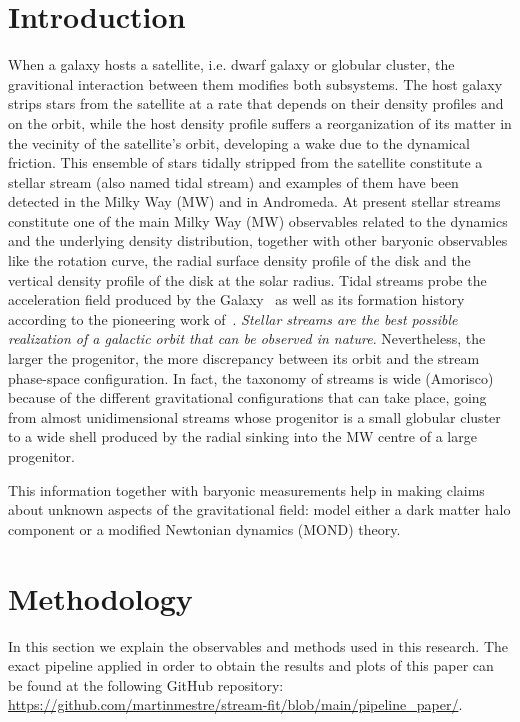 \documentclass[twocolumn]{aa}
\begin{document}
   \maketitle

\section{Introduction}
When a galaxy hosts a satellite, i.e. dwarf galaxy or globular cluster, the gravitional interaction
between them modifies both subsystems. The host galaxy strips stars from the satellite at a rate
that depends on their density profiles and on the orbit,
while the host density profile suffers a reorganization of its matter in the vecinity of the satellite's orbit, developing a wake due to the dynamical friction.
This ensemble of stars tidally stripped from the satellite constitute a stellar stream (also named tidal stream) and examples of them have been detected in the Milky Way (MW) and in Andromeda.
At present stellar streams constitute one of the main Milky Way (MW) observables related to the dynamics and the underlying density distribution, together with other baryonic observables like the rotation curve, the radial surface density profile of the disk and the vertical density profile of the disk at the solar radius.
Tidal streams probe the acceleration field produced by the Galaxy~\citep{1999ApJ...512L.109J,2016ASSL..420..169J,Ibata_2016,2017ApJ...842..120I,2017A&A...603A..65T} as well as its formation history according
to the pioneering work of~\citet{1999Natur.402...53H}.
{\it Stellar streams are the best possible realization of a galactic orbit that can be observed in nature}.
Nevertheless, the larger the progenitor, the more discrepancy between its orbit and the stream phase-space configuration. In fact, the taxonomy of streams is wide (Amorisco) because of the different gravitational configurations that can take place, going from almost unidimensional streams whose progenitor is a small globular cluster to a wide shell produced by the radial sinking into the MW centre of a large progenitor.

This information together with baryonic measurements help in making claims about unknown aspects of the gravitational field: model either a dark matter halo component or a modified Newtonian dynamics (MOND) theory.


\section{Methodology}
In this section we explain the observables and methods used in this research.
The exact pipeline applied in order to obtain the results and plots of this paper
can be found at the following GitHub repository:
\url{https://github.com/martinmestre/stream-fit/blob/main/pipeline_paper/}.
\end{document}
